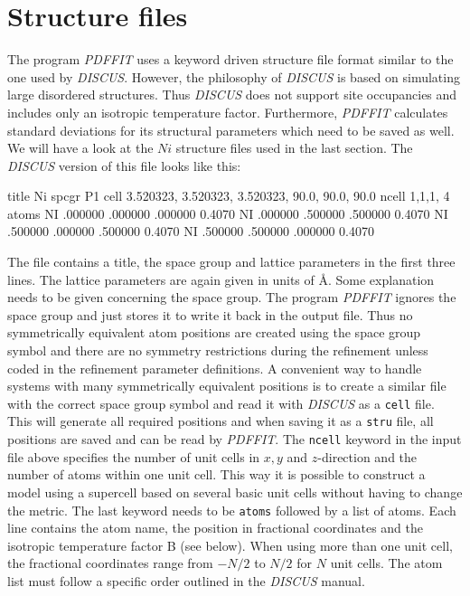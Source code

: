 \section{Structure files \label{file_stru}}

The program {\it PDFFIT} uses a keyword driven structure file format
similar to the one used by {\it DISCUS}. However, the philosophy of
{\it DISCUS} is based on simulating large disordered structures. Thus
{\it DISCUS} does not support site occupancies and includes only an
isotropic temperature factor. Furthermore, {\it PDFFIT} calculates
standard deviations for its structural parameters which need to be
saved as well. We will have a look at the $Ni$ structure files used
in the last section. The {\it DISCUS} version of this file looks like
this:

\begin{MacVerbatim}
    title Ni
    spcgr P1
    cell  3.520323,    3.520323,    3.520323,   90.0,   90.0,   90.0
    ncell 1,1,1, 4
    atoms
    NI      .000000   .000000   .000000     0.4070
    NI      .000000   .500000   .500000     0.4070
    NI      .500000   .000000   .500000     0.4070
    NI      .500000   .500000   .000000     0.4070
\end{MacVerbatim}

The file contains a title, the space group and lattice parameters in
the first three lines. The lattice parameters are again given in
units of \AA. Some explanation needs to be given concerning the
space group. The program {\it PDFFIT} ignores the space group and
just stores it to write it back in the output file. Thus no
symmetrically equivalent atom positions are created using the space
group symbol and there are no symmetry restrictions during the
refinement unless coded in the refinement parameter definitions. A
convenient way to handle systems with many symmetrically equivalent
positions is to create a similar file with the correct space group
symbol and read it with {\it DISCUS} as a {\tt cell} file. This will
generate all required positions and when saving it as a {\tt stru}
file, all positions are saved and can be read by {\it PDFFIT}. The
{\tt ncell} keyword in the input file above specifies the number of
unit cells in $x,y$ and $z$-direction and the number of atoms within
one unit cell. This way it is possible to construct a model using a
supercell based on several basic unit cells without having to change
the metric. The last keyword needs to be {\tt atoms} followed by a
list of atoms. Each line contains the atom name, the position in
fractional coordinates and the isotropic temperature factor B (see
below). When using more than one unit cell, the fractional
coordinates range from $-N/2$ to $N/2$ for $N$ unit cells. The atom
list must follow a specific order outlined in the {\it DISCUS}
manual. \par

